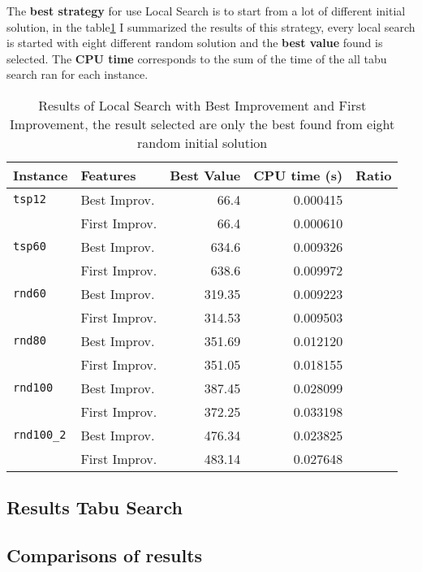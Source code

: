 	The \textbf{best strategy} for use Local Search is to start from a lot of different initial solution, in the table\ref{tab:LS-BestStrategyResult} I summarized the results of this strategy, every local search is started with eight different random solution and the \textbf{best value} found is selected. The \textbf{CPU time} corresponds to the sum of the time of the all tabu search ran for each instance.
	
	\begin{table}
		\centering
		\begin{tabular}{llrrr}
			\toprule
			\textbf{Instance} & \textbf{Features} & \textbf{Best Value} & \textbf{CPU time (s)} & \textbf{Ratio} \\
			\midrule
			\verb|tsp12| & Best Improv. & 66.4 & 0.000415 & \\
							& First Improv. & 66.4 & 0.000610 & \\
			\midrule
			\verb|tsp60| 	& Best Improv. & 634.6 & 0.009326 & \\
							& First Improv. & 638.6 & 0.009972 & \\
			\midrule
			\verb|rnd60| 	& Best Improv. & 319.35 & 0.009223 & \\
							& First Improv. & 314.53 & 0.009503 & \\
			\midrule
			\verb|rnd80| 	& Best Improv. & 351.69 & 0.012120 & \\
							& First Improv. & 351.05 & 0.018155 & \\
			\midrule
			\verb|rnd100| 	& Best Improv. & 387.45 & 0.028099 & \\
							& First Improv. & 372.25 & 0.033198 & \\
			\midrule
			\verb|rnd100_2| & Best Improv. & 476.34 & 0.023825 & \\
							& First Improv. & 483.14 & 0.027648 & \\
			\bottomrule
		\end{tabular}
		\caption{\label{tab:LS-BestStrategyResult} Results of Local Search with Best Improvement and First Improvement, the result selected are only the best found from eight random initial solution}
	\end{table}
	

\subsection{Results Tabu Search}


\subsection{Comparisons of results}